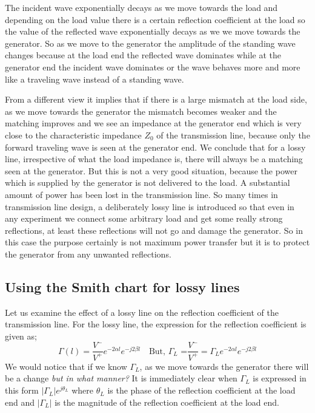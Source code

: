 The incident wave exponentially decays as we move towards the load and depending on the load value there is a certain reflection coefficient at the load so the value of the reflected wave exponentially decays as we we move towards the generator. So as we move to the generator the amplitude of the standing wave changes because at the load end the reflected wave dominates while at the generator end the incident wave dominates or the wave behaves more and more like a traveling wave instead of a standing wave.

From a different view it implies that if there is a large mismatch at the load side, as we move towards the generator the mismatch becomes weaker and the matching improves and we see an impedance at the generator end which is very close to the characteristic impedance $Z_0$ of the transmission line, because only the forward traveling wave is seen at the generator end. We conclude that for a lossy line, irrespective of what the load impedance is, there will always be a matching seen at the generator. But this is not a very good situation, because the power which is supplied by the generator is not delivered to the load. A substantial amount of power has been lost in the transmission line. So many times in transmission line design, a deliberately lossy line is introduced so that even in any experiment we connect some arbitrary load and get  some really strong reflections, at least these reflections will not go and damage the generator. So in this case the purpose certainly is not maximum power transfer but it is to protect the generator from any unwanted reflections.

\subsection{Using the Smith chart for lossy lines}
Let us examine the effect of a lossy line on the reflection coefficient of the transmission line. For the lossy line, the expression for the reflection coefficient is given as;
\begin{dmath*}
\Gamma{(l)} = \frac{V^-}{V^+}e^{-2\alpha l}e^{-j2\beta l}\quad\text{But, }\Gamma_L\text{ =}\frac{V^-}{V^+}
= \Gamma_Le^{-2\alpha l}e^{-j2\beta l}
\end{dmath*}
We would notice that if we know $\Gamma_L$, as we move towards the generator there will be a change \emph{but in what manner?} It is immediately clear when $\Gamma_L$ is expressed in this form $|\Gamma_L |e^{j\theta_L}$ where $\theta_L$ is the phase of the reflection coefficient at the load end and $|\Gamma_L|$ is the magnitude of the reflection coefficient at the load end.

